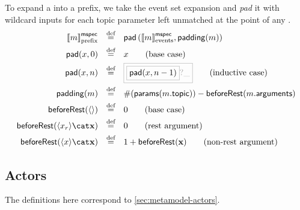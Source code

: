 \begin{definition}

To expand a \mmessagespec{} into a prefix, we take the event set expansion and
 \emph{pad} it with wildcard inputs for each topic parameter
left unmatched at the point of any \mrestargument.
%
\begin{align*}
	\pmspecsema{\amspec}
\quad\defeq\quad&
	\funcname{pad}\left(\emspecsema{\amspec}, \funcname{padding}(\amspec)\right)
\\
	\funcname{pad}(x, 0)
\quad\defeq\quad&
	x
\tag{base case}
\\
	\funcname{pad}(x, n)
\quad\defeq\quad&
\tlang{
	\olang{\funcname{pad}(x, n-1)}?\_
}
\tag{inductive case}
\\
	\funcname{padding}(\amspec)
\quad\defeq\quad&
	\#(\paramsOf{\field{\amspec}{topic}}) - \beforeRest{\field{\amspec}{arguments}}
\\
	\beforeRest{\langle\rangle}
\quad\defeq\quad&
	0
\tag{base case}
\\
	\beforeRest{\langle \arestarg \rangle \cat \anarglist}
\quad\defeq\quad&
	0
\tag{rest argument}
\\
	\beforeRest{\langle \anarg \rangle \cat \anarglist}
\quad\defeq\quad&
	1 + \beforeRest{\anarglist}
\tag{non-rest argument}
\end{align*}
\end{definition}

\subsection{Actors}\label{ssec:semantics-tockcsp-actors}

The definitions here correspond to \cref{sec:metamodel-actors}.


